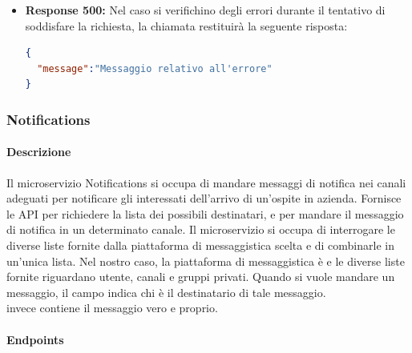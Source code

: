 \begin{itemize}
\begin{itemize}
\begin{lstlisting}[language=json,firstnumber=1]
{
  "status":403,
  "msg":"Forbidden"
}
\end{lstlisting}
\item \textbf{Response 500:} Nel caso si verifichino degli errori durante il tentativo di soddisfare la richiesta, la chiamata restituirà la seguente risposta:
\begin{lstlisting}[language=json,firstnumber=1]
{
  "message":"Messaggio relativo all'errore"
}
\end{lstlisting}
\end{itemize}
\end{itemize}


\subsubsection{Notifications}
\paragraph{Descrizione}
Il microservizio Notifications si occupa di mandare messaggi di notifica nei canali adeguati per notificare gli interessati dell'arrivo di un'ospite in azienda. Fornisce le API per richiedere la lista dei possibili destinatari, e per mandare il messaggio di notifica in un determinato canale.
Il microservizio si occupa di interrogare le diverse liste fornite dalla piattaforma di messaggistica scelta e di combinarle in un'unica lista. Nel nostro caso, la piattaforma di messaggistica è  e le diverse liste fornite riguardano utente, canali e gruppi privati. Quando si vuole mandare un messaggio, il campo  indica chi è il destinatario di tale messaggio.\\  invece contiene il messaggio vero e proprio.
\paragraph{Endpoints}

